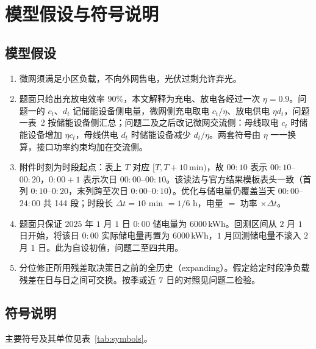 \section{模型假设与符号说明}


\subsection{模型假设}

\begin{enumerate}
  \item {}微网须满足小区负载，不向外网售电，光伏过剩允许弃光。
  \item {}题面只给出充放电效率 $90\%$，本文解释为充电、放电各经过一次 $\eta=0.9$。问题一的 $c_t$、$d_t$ 记储能设备侧电量，微网侧充电取电 $c_t/\eta$、放电供电 $\eta d_t$，问题一表~2 按储能设备侧汇总；问题二及之后改记微网交流侧：母线取电 $c_t$ 时储能设备增加 $\eta c_t$，母线供电 $d_t$ 时储能设备减少 $d_t/\eta$。两套符号由 $\eta$ 一一换算，接口功率约束均加在交流侧。
  \item {}附件时刻为时段起点：表上 $T$ 对应 $[T,T+10\,\mathrm{min})$，故 $00{:}10$ 表示 $00{:}10$--$00{:}20$，$0{:}00{+}1$ 表示次日 $00{:}00$--$00{:}10$。该读法与官方结果模板表头一致（首列 $0{:}10$--$0{:}20$，末列跨至次日 $0{:}00$--$0{:}10$）。优化与储电量仍覆盖当天 $00{:}00$--$24{:}00$ 共 144 段；时段长 $\Delta t=10$ min $=1/6$ h，电量 $=$ 功率 $\times\Delta t$。
  \item {}题面只保证 $2025$ 年 $1$ 月 $1$ 日 $0{:}00$ 储电量为 $6000$\,kWh。回测区间从 $2$ 月 $1$ 日开始，将该日 $0{:}00$ 实际储电量再置为 $6000$\,kWh，$1$ 月回测储电量不滚入 $2$ 月 $1$ 日。此为自设初值，问题二至四共用。
  \item {}分位修正所用残差取决策日之前的全历史（expanding）。假定给定时段净负载残差在日与日之间可交换。按季或近 $7$ 日的对照见问题二检验。
\end{enumerate}

\subsection{符号说明}

主要符号及其单位见表~\ref{tab:symbols}。

